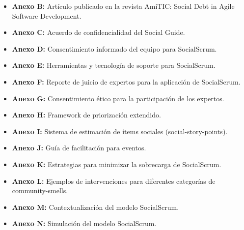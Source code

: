 \begin{itemize}
\begin{itemize}
              \item \textbf{Anexo B:} Artículo publicado en la revista AmiTIC: Social Debt in Agile Software Development.
              \item \textbf{Anexo C:} Acuerdo de confidencialidad del Social Guide.
              \item \textbf{Anexo D:} Consentimiento informado del equipo para SocialScrum.
              \item \textbf{Anexo E:} Herramientas y tecnología de soporte para SocialScrum.
              \item \textbf{Anexo F:} Reporte de juicio de expertos para la aplicación de SocialScrum.
              \item \textbf{Anexo G:} Consentimiento ético para la participación de los expertos.
              \item \textbf{Anexo H:} Framework de priorización extendido.
              \item \textbf{Anexo I:} Sistema de estimación de ítems sociales (\gls{social-story-points}).
              \item \textbf{Anexo J:} Guía de facilitación para eventos.
              \item \textbf{Anexo K:} Estrategias para minimizar la sobrecarga de SocialScrum.
              \item \textbf{Anexo L:} Ejemplos de intervenciones para diferentes categorías de \gls{community-smells}.
              \item \textbf{Anexo M:} Contextualización del modelo SocialScrum.
              \item \textbf{Anexo N:} Simulación del modelo SocialScrum.
          \end{itemize}
\end{itemize}